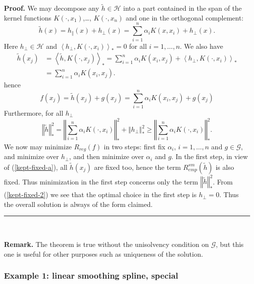 \documentclass[11pt,twoside]{article}%
\theoremstyle{change}
\newenvironment{proof}[1][Proof]{\textbf{#1.} }{\ \rule{0.5em}{0.5em}}
\begin{document}
\begin{proof}
We may decompose any $\tilde{h}\in\mathcal{H}$ into a part contained in the
span of the kernel functions $K\left(  \cdot,x_{1}\right)  $,\ldots, $K\left(
\cdot,x_{n}\right)  $ and one in the orthogonal complement:
\[
\tilde{h}(x)=h_{\Vert}(x)+h_{\bot}(x)=\sum_{i=1}^{n}\alpha_{i}K\left(
x,x_{i}\right)  +h_{\bot}(x).
\]
Here $h_{\bot}\in\mathcal{H}$ and $\left\langle h_{\bot},K\left(  \cdot
,x_{i}\right)  \right\rangle _{\ast}=0$ for all $i=1,\ldots,n$. We also have
\begin{align}
\tilde{h}(x_{j})  & =\left\langle \tilde{h},K\left(  \cdot,x_{j}\right)
\right\rangle _{\ast}=\sum_{i=1}^{n}\alpha_{i}K\left(  x_{i},x_{j}\right)
+\left\langle h_{\bot},K\left(  \cdot,x_{i}\right)  \right\rangle _{\ast}\\
& =\sum_{i=1}^{n}\alpha_{i}K\left(  x_{i},x_{j}\right)  .
\end{align}
hence
\begin{equation}
f(x_{j})=\tilde{h}(x_{j})+g(x_{j})=\sum_{i=1}^{n}\alpha_{i}K\left(
x_{i},x_{j}\right)  +g(x_{j})\label{kept-fixed-a}%
\end{equation}
Furthermore, for all $h_{\bot}$
\begin{equation}
\left\Vert \tilde{h}\right\Vert _{\ast}^{2}=\left\Vert \sum_{i=1}^{n}%
\alpha_{i}K\left(  \cdot,x_{i}\right)  \right\Vert _{\ast}^{2}+\left\Vert
h_{\bot}\right\Vert _{\ast}^{2}\geq\left\Vert \sum_{i=1}^{n}\alpha_{i}K\left(
\cdot,x_{i}\right)  \right\Vert _{\ast}^{2}.
\end{equation}
We now may minimize $R_{reg}(f)$ in two steps: first fix $\alpha_{i}$,
$i=1,\ldots,n$ and $g\in\mathcal{G}$, and minimize over $h_{\bot}$, and then
minimize over $\alpha_{i}$ and $g$. In the first step, in view of
(\ref{kept-fixed-a}), all $\tilde{h}(x_{j})$ are fixed too, hence the term
$R_{emp}^{sm}(\tilde{h})$ is also fixed. Thus minimization in the first step
concerns only the term $\left\Vert \tilde{h}\right\Vert _{\ast}^{2}$. From
(\ref{kept-fixed-2}) we see that the optimal choice in the first step is
$h_{\bot}=0$. Thus the overall solution is always of the form claimed.
\end{proof}

\textbf{\ } \bigskip\bigskip

\textbf{Remark.} The theorem is true without the unisolvency condition on
$\mathcal{G}$, but this one is useful for other purposes such as uniqueness of
the solution. \bigskip\bigskip

\subsubsection{Example 1: linear smoothing spline, special}
\end{document}

